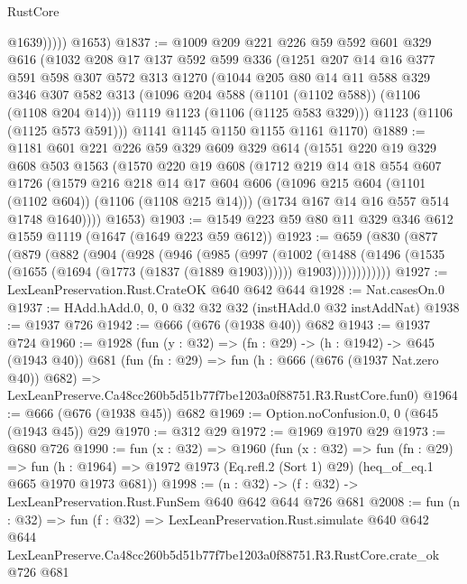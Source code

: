 \begin{lexlean}{RustCore}
\begin{coremodule}
                @1639)))))
      @1653)
@1837 := @1009
    @209
    @221
    @226
    @59
    @592
    @601
    @329
    @616
    (@1032
      @208
      @17
      @137
      @592
      @599
      @336
      (@1251
        @207
        @14
        @16
        @377
        @591
        @598
        @307
        @572
        @313
        @1270
        (@1044
          @205
          @80
          @14
          @11
          @588
          @329
          @346
          @307
          @582
          @313
          (@1096 @204 @588 (@1101 (@1102 @588)) (@1106 (@1108 @204 @14)))
          @1119
          @1123
          (@1106 (@1125 @583 @329)))
        @1123
        (@1106 (@1125 @573 @591)))
      @1141
      @1145
      @1150
      @1155
      @1161
      @1170)
@1889 := @1181
    @601
    @221
    @226
    @59
    @329
    @609
    @329
    @614
    (@1551
      @220
      @19
      @329
      @608
      @503
      @1563
      (@1570
        @220
        @19
        @608
        (@1712
          @219
          @14
          @18
          @554
          @607
          @1726
          (@1579
            @216
            @218
            @14
            @17
            @604
            @606
            (@1096 @215 @604 (@1101 (@1102 @604)) (@1106 (@1108 @215 @14)))
            (@1734 @167 @14 @16 @557 @514 @1748 @1640))))
      @1653)
@1903 := @1549 @223 @59 @80 @11 @329 @346 @612 @1559 @1119 (@1647 (@1649 @223 @59 @612))
@1923 := @659
    (@830
      (@877
        (@879
          (@882
            (@904
              (@928
                (@946
                  (@985
                    (@997
                      (@1002
                        (@1488
                          (@1496
                            (@1535 (@1655 (@1694 (@1773 (@1837 (@1889 @1903))))))
                            @1903))))))))))))
@1927 := LexLeanPreservation.Rust.CrateOK @640 @642 @644
@1928 := Nat.casesOn.{0}
@1937 := HAdd.hAdd.{0, 0, 0} @32 @32 @32 (instHAdd.{0} @32 instAddNat)
@1938 := @1937 @726
@1942 := @666 (@676 (@1938 @40)) @682
@1943 := @1937 @724
@1960 := @1928
    (fun (y : @32) => (fn : @29) -> (h : @1942) -> @645 (@1943 @40))
    @681
    (fun (fn : @29) =>
    fun (h : @666 (@676 (@1937 Nat.zero @40)) @682) =>
    LexLeanPreserve.Ca48cc260b5d51b77f7be1203a0f88751.R3.RustCore.fun0)
@1964 := @666 (@676 (@1938 @45)) @682
@1969 := Option.noConfusion.{0, 0} (@645 (@1943 @45)) @29
@1970 := @312 @29
@1972 := @1969 @1970 @29
@1973 := @680 @726
@1990 := fun (x : @32) =>
  @1960
    (fun (x : @32) =>
    fun (fn : @29) =>
    fun (h : @1964) => @1972 @1973 (Eq.refl.{2} (Sort 1) @29) (heq_of_eq.{1} @665 @1970 @1973 @681))
@1998 := (n : @32) -> (f : @32) -> LexLeanPreservation.Rust.FunSem @640 @642 @644 @726 @681
@2008 := fun (n : @32) =>
  fun (f : @32) =>
  LexLeanPreservation.Rust.simulate
    @640
    @642
    @644
    LexLeanPreserve.Ca48cc260b5d51b77f7be1203a0f88751.R3.RustCore.crate_ok
    @726
    @681
\end{coremodule}
\end{lexlean}
